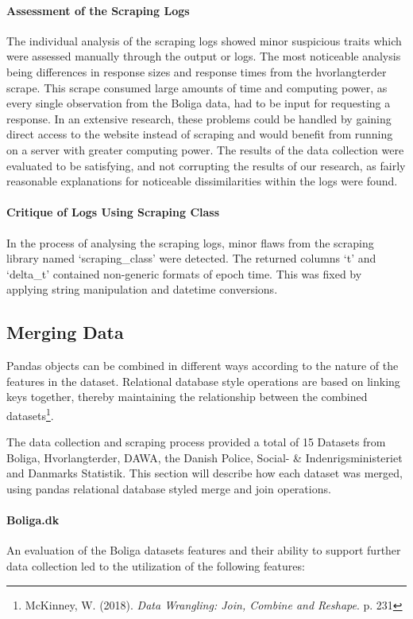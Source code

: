 \documentclass[12pt,a4paper]{article}
\begin{document}
\paragraph{Assessment of the Scraping Logs\newline}
The individual analysis of the scraping logs showed minor suspicious traits which were assessed manually through the output or logs. The most noticeable analysis being differences in response sizes and response times from the hvorlangterder scrape. This scrape consumed large amounts of time and computing power, as every single observation from the Boliga data, had to be input for requesting a response. In an extensive research, these problems could be handled by gaining direct access to the website instead of scraping and would benefit from running on a server with greater computing power. The results of the data collection were evaluated to be satisfying, and not corrupting the results of our research, as fairly reasonable explanations for noticeable dissimilarities within the logs were found. 

\paragraph{Critique of Logs Using Scraping Class\newline}
In the process of analysing the scraping logs, minor flaws from the scraping library named ‘scraping\_class’ were detected. The returned columns ‘t’ and ‘delta\_t’ contained non-generic formats of epoch time. This was fixed by applying string manipulation and datetime conversions. 

\subsection{Merging Data}
Pandas objects can be combined in different ways according to the nature of the features in the dataset. Relational database style operations are based on linking keys together, thereby maintaining the relationship between the combined datasets\footnote{McKinney, W. (2018). \textit{Data Wrangling: Join, Combine and Reshape}. p. 231 }.

The data collection and scraping process provided a total of 15 Datasets from Boliga, Hvorlangterder, DAWA, the Danish Police, Social- \& Indenrigsministeriet and Danmarks Statistik. This section will describe how each dataset was merged, using pandas relational database styled merge and join operations. 

\paragraph{Boliga.dk\newline}
An evaluation of the Boliga datasets features and their ability to support further data collection led to the utilization of the following features: 
\end{document}

